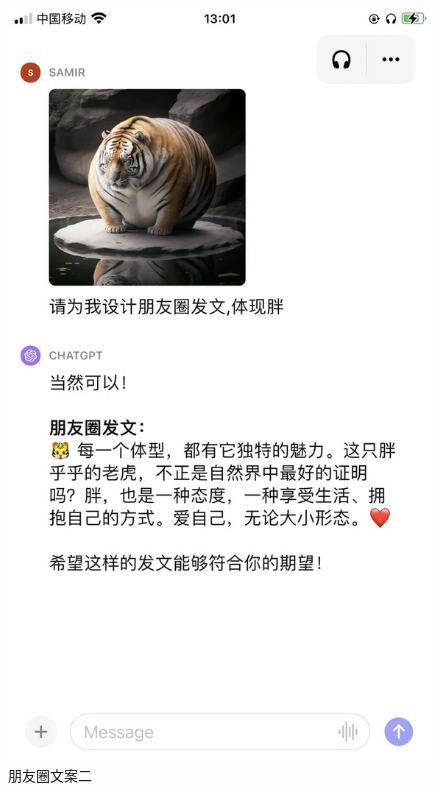 \documentclass[12pt]{book}
\begin{document}
   \begin{figure}[htbp]
	\centering
	\includegraphics[width=1.0\textwidth]{image/2.png}
	
	\caption{朋友圈文案二}
	\label{fig:myImage}
\end{figure}
\end{document}
